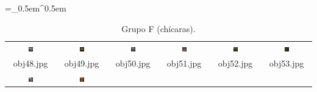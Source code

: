 \begin{table}[H]
  \centering
  \caption{Grupo F (chícaras).}
  \tabulinesep =_0.5em^0.5em
  \everyrow{\tabucline[0.4pt]-}
  \begin{tabu}{|cccccc|}
    \includegraphics[width=0.1\textwidth,height=0.1\textwidth]{imagens/coil_100/chicaras/obj10__0.png} &
    \includegraphics[width=0.1\textwidth,height=0.1\textwidth]{imagens/coil_100/chicaras/obj11__0.png} &
    \includegraphics[width=0.1\textwidth,height=0.1\textwidth]{imagens/coil_100/chicaras/obj16__0.png} &
    \includegraphics[width=0.1\textwidth,height=0.1\textwidth]{imagens/coil_100/chicaras/obj16__0_1.png} &
    \includegraphics[width=0.1\textwidth,height=0.1\textwidth]{imagens/coil_100/chicaras/obj43__0.png} &
    \includegraphics[width=0.1\textwidth,height=0.1\textwidth]{imagens/coil_100/chicaras/obj43__0_1.png}
    \\
    \scriptsize{obj48.jpg} & \scriptsize{obj49.jpg} & \scriptsize{obj50.jpg} &
    \scriptsize{obj51.jpg} & \scriptsize{obj52.jpg} & \scriptsize{obj53.jpg}
    \\
    \includegraphics[width=0.1\textwidth,height=0.1\textwidth]{imagens/coil_100/chicaras/obj45__0.png} &
    \includegraphics[width=0.1\textwidth,height=0.1\textwidth]{imagens/coil_100/chicaras/obj59__0.png} &

\end{tabu}
\end{table}
